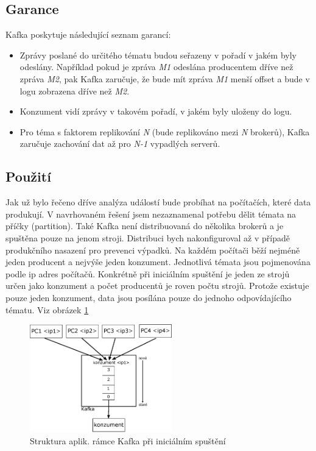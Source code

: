 \documentclass[
  digital, %
  table,   %
  nolof,     %
  nolot,     %
  oneside, %
  nocover,
  monochrome,
  12pt
]{fithesis3}
\begin{document}
\subsection*{Garance}
Kafka poskytuje následující seznam garancí:
\begin{itemize}
  \item Zprávy poslané do určitého tématu budou seřazeny v pořadí v jakém byly odeslány. Například pokud je zpráva \textit{M1} odeslána producentem dříve než zpráva \textit{M2}, pak Kafka zaručuje, že bude mít zpráva \textit{M1} menší offset a bude v logu zobrazena dříve než \textit{M2}.
  \item Konzument vidí zprávy v takovém pořadí, v jakém byly uloženy do logu.
  \item Pro téma s faktorem replikování \textit{N} (bude replikováno mezi \textit{N} brokerů), Kafka zaručuje zachování dat až pro \textit{N-1} vypadlých serverů.
\end{itemize}

\subsection*{Použití}
Jak už bylo řečeno dříve analýza událostí bude probíhat na počítačích, které data produkují. V navrhovaném řešení jsem nezaznamenal potřebu dělit témata na příčky (partition). Také Kafka není distribuovaná do několika brokerů a je spuštěna pouze na jenom stroji. Distribuci bych nakonfiguroval až v případě produkčního nasazení pro prevenci výpadků. Na každém počítači běží nejméně jeden producent a nejvýše jeden konzument. Jednotlivá témata jsou pojmenována podle ip adres počítačů. Konkrétně při iniciálním spuštění je jeden ze strojů určen jako konzument a počet producentů je roven počtu strojů. Protože existuje pouze jeden konzument, data jsou posílána pouze do jednoho odpovídajícího tématu. Viz obrázek \ref{fig:kafka-impl}

\begin{figure}[H]
	\centering
    \includegraphics[width=0.55\textwidth, height=0.3\textheight]{images/kafka-impl.eps}
    \caption{Struktura aplik. rámce Kafka při iniciálním spuštění}
    \label{fig:kafka-impl}
\end{figure}
\end{document}
